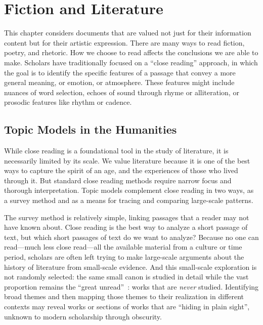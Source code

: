 
\chapter{Fiction and Literature}

\label{ch:fiction}

This chapter considers documents that are valued not just for their information content but for their artistic expression.
There are many ways to read fiction, poetry, and rhetoric.  How we choose to read affects the conclusions we are able to make.
Scholars have traditionally focused on a ``close reading'' approach, in which the goal is to identify the specific features of a passage that convey a more general meaning, or emotion, or atmosphere.
These features might include nuances of word  selection, echoes of sound through rhyme or alliteration, or prosodic features like rhythm or cadence.

\section{Topic Models in the Humanities}

While close reading is a foundational tool in the study of literature, it is necessarily limited by its scale.
We value literature because it is one of the best ways to capture the spirit of an age, and the experiences of those who lived through it. But standard close reading methods require narrow focus and thorough interpretation.
Topic models complement close reading in two ways, as a survey method and as a means for tracing and comparing large-scale patterns.

The survey method is relatively simple, linking passages that a reader may not have known about.
Close reading is the best way to analyze a short passage of text, but which short passages of text do we want to analyze?
Because no one can read---much less close read---all the available material from a culture or time period, scholars are often left trying to make large-scale arguments about the history of literature from small-scale evidence. And this small-scale exploration is not randomly selected: the same small canon is studied in detail while the vast proportion remains the ``great unread''~\citep{moretti-00}: works that are \emph{never} studied.
Identifying broad themes and then mapping those themes to their realization in different contexts may reveal works or sections of works that are ``hiding in plain sight'', unknown to modern scholarship through obscurity.

